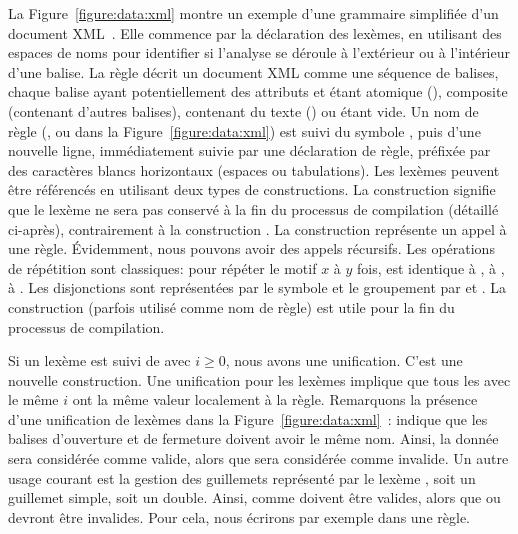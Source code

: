 La Figure~\ref{figure:data:xml} montre un exemple d'une grammaire simplifiée
d'un document XML~. Elle commence par la déclaration des lexèmes, en
utilisant des espaces de noms pour identifier si l'analyse se déroule à
l'extérieur ou à l'intérieur d'une balise. La règle  décrit un
document XML comme une séquence de balises, chaque balise ayant potentiellement
des attributs et étant atomique (), composite (contenant d'autres
balises), contenant du texte () ou étant vide. Un
nom de règle (,  ou  dans la
Figure~\ref{figure:data:xml}) est suivi du symbole \code{:}, puis d'une nouvelle
ligne, immédiatement suivie par une {\strong déclaration de règle}, préfixée par
des caractères blancs horizontaux (espaces ou tabulations). Les lexèmes peuvent
être référencés en utilisant deux types de constructions. La construction
 signifie que le lexème ne sera pas conservé à la fin du
processus de compilation (détaillé ci-après), contrairement à la construction
. La construction  représente un appel à une règle.
Évidemment, nous pouvons avoir des appels récursifs. Les opérations de
répétition sont classiques:  pour répéter le motif $x$ à $y$
fois,  est identique à , \code{+} à ,
\code{*} à . Les disjonctions sont représentées par le symbole
\code{\mvert} et le groupement par \code{(} et \code{)}. La construction
 (parfois utilisé comme nom de règle) est utile pour la fin du
processus de compilation.

Si un lexème est suivi de \code{[$i$]} avec $i \geq 0$, nous avons une
unification. C'est une nouvelle construction. Une unification pour les lexèmes
implique que tous les  avec le même $i$ ont la même valeur
localement à la règle.  Remarquons la présence d'une unification de lexèmes dans
la Figure~\ref{figure:data:xml}~:  indique que les balises
d'ouverture et de fermeture doivent avoir le même nom. Ainsi, la donnée
 sera considérée comme valide, alors que 
sera considérée comme invalide. Un autre usage courant est la gestion des
guillemets représenté par le lexème , soit un guillemet
simple, soit un double. Ainsi,  comme  doivent être valides,
alors que  ou  devront être invalides. Pour cela, nous
écrirons par exemple  dans une règle.

